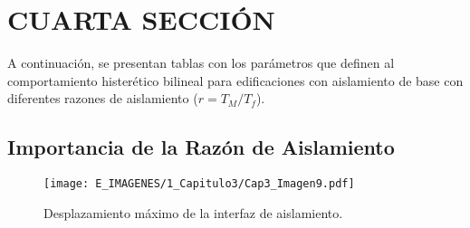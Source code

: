 \section{CUARTA SECCIÓN}

\lipsum[20]

A continuación, se presentan tablas con los parámetros que definen al comportamiento histerético bilineal para edificaciones con aislamiento de base con diferentes razones de aislamiento ($r=T_{M}/T_{f}$).



\subsection{Importancia de la Razón de Aislamiento}

\lipsum[29]

\begin{figure}[!h]
	\centering
	\texttt{[image: E\_IMAGENES/1\_Capitulo3/Cap3\_Imagen9.pdf]}
	\vspace{-3 mm}
	\caption[Desplazamiento máximo de la interfaz de aislamiento]{\centering\footnotesize Desplazamiento máximo de la interfaz de aislamiento.}
	\label{Cap3_Figura9}
\end{figure}

